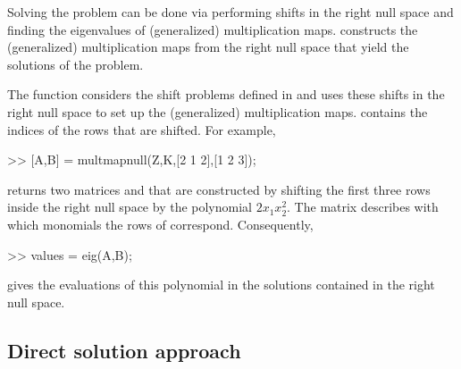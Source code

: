 \documentclass{manual}
\begin{document}
            Solving the problem can be done via performing shifts in the right null space and finding the eigenvalues of (generalized) multiplication maps. 
             constructs the (generalized) multiplication maps from the right null space that yield the solutions of the problem.
            \begin{code}
                The function  considers the shift problems defined in  and uses these shifts in the right null space  to set up the (generalized) multiplication maps.
                 contains the indices of the rows that are shifted.
                For example,
                \begin{codeblock}
                    >> {[A,B]} = multmapnull(Z,K,[2 1 2],[1 2 3]);
                \end{codeblock}
                \noindent returns two matrices  and  that are constructed by shifting the first three rows inside the right null space  by the polynomial $2 x_1 x_2^2$. 
                The matrix  describes with which monomials the rows of  correspond. 
                Consequently,
                \begin{codeblock}
                    >> values = eig(A,B);
                \end{codeblock}
                \noindent gives the evaluations of this polynomial in the solutions contained in the right null space.
            \end{code}

        \subsection{Direct solution approach}
            \label{sec:manual:standard}
\end{document}
